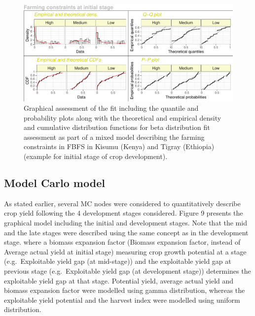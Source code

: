 \documentclass[12pt,oneside]{article}
\begin{document}
\begin{figure}[!htbp]

{\centering \includegraphics{Modelling_FBFS_Supplement_files/figure-latex/fig8-1} 

}

\caption{Graphical assessment of the fit including the quantile and probability plots along with the theoretical and empirical density and cumulative distribution functions for beta distribution fit assessment as part of a mixed model describing the farming constraints in FBFS in Kisumu (Kenya) and Tigray (Ethiopia) (example for initial stage of crop development).}\label{fig:fig8}
\end{figure}

\hypertarget{I2}{%
\subsection{Model Carlo model}\label{I2}}

As stated earlier, several MC nodes were considered to quantitatively describe crop yield following the 4 development stages considered. Figure 9 presents the graphical model including the initial and development stages. Note that the mid and the late stages were described using the same concept as in the development stage. where a biomass expansion factor (Biomass expansion factor, instead of Average actual yield at initial stage) measuring crop growth potential at a stage (e.g.~Exploitable yield gap (at mid-stage)) and the exploitable yield gap at previous stage (e.g.~Exploitable yield gap (at development stage)) determines the exploitable yield gap at that stage. Potential yield, average actual yield and biomass expansion factor were modelled using gamma distribution, whereas the exploitable yield potential and the harvest index were modelled using uniform distribution.
\end{document}
